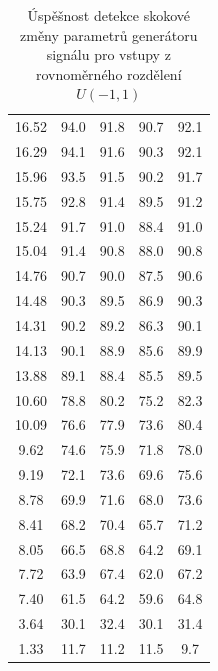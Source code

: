 \documentclass[11pt,twoside,openright]{report}
\begin{document}
\begin{appendices}
\begin{table}[h]
\begin{center}
\begin{tabular}{|c|c|c|c|c|}
16.52 & 94.0 & 91.8 & 90.7 & 92.1 \\ 
16.29 & 94.1 & 91.6 & 90.3 & 92.1 \\ 
15.96 & 93.5 & 91.5 & 90.2 & 91.7 \\ 
15.75 & 92.8 & 91.4 & 89.5 & 91.2 \\ 
15.24 & 91.7 & 91.0 & 88.4 & 91.0 \\ 
15.04 & 91.4 & 90.8 & 88.0 & 90.8 \\ 
14.76 & 90.7 & 90.0 & 87.5 & 90.6 \\ 
14.48 & 90.3 & 89.5 & 86.9 & 90.3 \\ 
14.31 & 90.2 & 89.2 & 86.3 & 90.1 \\ 
14.13 & 90.1 & 88.9 & 85.6 & 89.9 \\ 
13.88 & 89.1 & 88.4 & 85.5 & 89.5 \\ 
10.60 & 78.8 & 80.2 & 75.2 & 82.3 \\ 
10.09 & 76.6 & 77.9 & 73.6 & 80.4 \\ 
9.62 & 74.6 & 75.9 & 71.8 & 78.0 \\ 
9.19 & 72.1 & 73.6 & 69.6 & 75.6 \\ 
8.78 & 69.9 & 71.6 & 68.0 & 73.6 \\ 
8.41 & 68.2 & 70.4 & 65.7 & 71.2 \\ 
8.05 & 66.5 & 68.8 & 64.2 & 69.1 \\ 
7.72 & 63.9 & 67.4 & 62.0 & 67.2 \\ 
7.40 & 61.5 & 64.2 & 59.6 & 64.8 \\ 
3.64 & 30.1 & 32.4 & 30.1 & 31.4 \\ 
1.33 & 11.7 & 11.2 & 11.5 & 9.7 \\ 
\hline
\end{tabular}
\caption{Úspěšnost detekce skokové změny parametrů generátoru signálu pro vstupy z rovnoměrného rozdělení $U(-1,1)$}
\label{tab:uniform}
\end{center}
\end{table}



\end{appendices}
\end{document}
